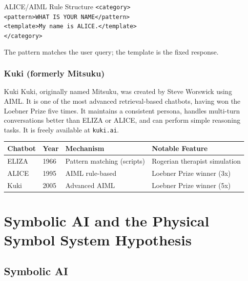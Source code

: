 \documentclass[12pt,a4paper]{report}
\begin{document}
\begin{examplebox}{ALICE/AIML Rule Structure}
\texttt{<category>}\\
\quad\texttt{<pattern>WHAT IS YOUR NAME</pattern>}\\
\quad\texttt{<template>My name is ALICE.</template>}\\
\texttt{</category>}
\vspace{0.2cm}

The pattern matches the user query; the template is the fixed response.
\end{examplebox}

\subsection{Kuki (formerly Mitsuku)}

\begin{defbox}{Kuki}
Kuki, originally named Mitsuku, was created by Steve Worswick using AIML. It is one of the most advanced retrieval-based chatbots, having won the Loebner Prize five times. It maintains a consistent persona, handles multi-turn conversations better than ELIZA or ALICE, and can perform simple reasoning tasks. It is freely available at \texttt{kuki.ai}.
\end{defbox}

\begin{center}
\begin{tabular}{llll}
\toprule
\textbf{Chatbot} & \textbf{Year} & \textbf{Mechanism} & \textbf{Notable Feature} \\
\midrule
ELIZA & 1966 & Pattern matching (scripts) & Rogerian therapist simulation \\
ALICE & 1995 & AIML rule-based & Loebner Prize winner (3x) \\
Kuki & 2005 & Advanced AIML & Loebner Prize winner (5x) \\
\bottomrule
\end{tabular}
\end{center}

\chapter{Symbolic AI and the Physical Symbol System Hypothesis}

\section{Symbolic AI}
\end{document}
